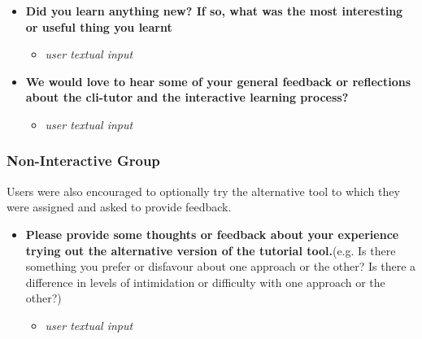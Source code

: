 \begin{itemize}
	\item  \textbf{Did you learn anything new? If so, what was the most interesting or useful thing you learnt}
	      \begin{itemize}
		      \item \textit{user textual input}
	      \end{itemize}

	\item  \textbf{We would love to hear some of your general feedback or reflections about the cli-tutor and the interactive learning process?}
	      \begin{itemize}
		      \item \textit{user textual input}
	      \end{itemize}
\end{itemize}

\subsubsection{Non-Interactive Group}
Users were also encouraged to optionally try the alternative tool to which they were assigned and asked to provide feedback.
\begin{itemize}
	\item  \textbf{Please provide some thoughts or feedback about your experience trying out the alternative version of the tutorial tool.}(e.g. Is there something you prefer or disfavour about one approach or the other? Is there a difference in levels of intimidation or difficulty with one approach or the other?)
	      \begin{itemize}
		      \item \textit{user textual input}
	      \end{itemize}
\end{itemize}
